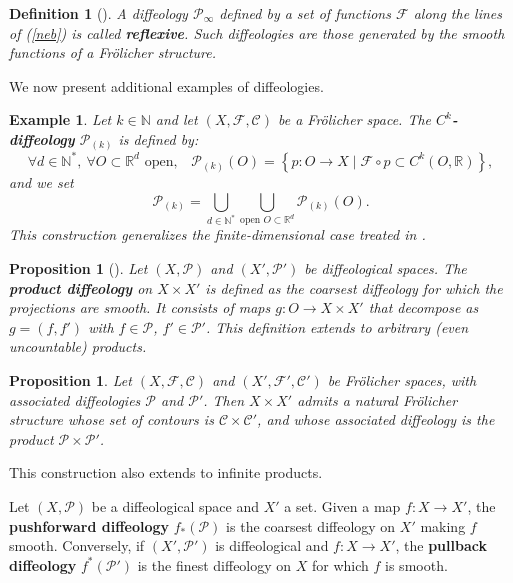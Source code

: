 \documentclass{amsart}
\def\R{\mathbb{R}}
\newcounter{thm}
\newcounter{ex}
\newcounter{re}
\newtheorem{Proposition}[thm]{Proposition}
\newtheorem{example}[thm]{Example}
\newtheorem{Definition}[thm]{Definition}
\begin{document}
\begin{Definition}[\cite{Wa}]
	A diffeology $\mathcal{P}_\infty$ defined by a set of functions $\mathcal{F}$ along the lines of {\rm (\ref{neb})} is called \textbf{reflexive}. Such diffeologies are those generated by the smooth functions of a Fr\"olicher structure.
\end{Definition}

We now present additional examples of diffeologies.

\begin{example}
	Let $k \in \mathbb{N}$ and let $(X, \mathcal{F}, \mathcal{C})$ be a Fr\"olicher space. The \textbf{$C^k$-diffeology} $\mathcal{P}_{(k)}$ is defined by:
	\[
	\forall d \in \mathbb{N}^*, \ \forall O \subset \R^d \text{ open,} \quad 
	\mathcal{P}_{(k)}(O) = \left\{ p: O \to X \mid \mathcal{F} \circ p \subset C^k(O, \R) \right\},
	\]
	and we set
	\[
	\mathcal{P}_{(k)} = \bigcup_{d \in \mathbb{N}^*} \bigcup_{\text{open } O \subset \R^d} \mathcal{P}_{(k)}(O).
	\]
	This construction generalizes the finite-dimensional case treated in \cite{Igdiff}.
\end{example}

\begin{Proposition}[\cite{Igdiff, Sou}] \label{prod1}
	Let $(X, \mathcal{P})$ and $(X', \mathcal{P}')$ be diffeological spaces. The \textbf{product diffeology} on $X \times X'$ is defined as the coarsest diffeology for which the projections are smooth. It consists of maps $g: O \to X \times X'$ that decompose as $g = (f, f')$ with $f \in \mathcal{P}$, $f' \in \mathcal{P}'$. This definition extends to arbitrary (even uncountable) products.
\end{Proposition}

\begin{Proposition} \label{prod2}
	Let $(X, \mathcal{F}, \mathcal{C})$ and $(X', \mathcal{F}', \mathcal{C}')$ be Fr\"olicher spaces, with associated diffeologies $\mathcal{P}$ and $\mathcal{P}'$. Then $X \times X'$ admits a natural Fr\"olicher structure whose set of contours is $\mathcal{C} \times \mathcal{C}'$, and whose associated diffeology is the product $\mathcal{P} \times \mathcal{P}'$.
\end{Proposition}

This construction also extends to infinite products.

Let $(X, \mathcal{P})$ be a diffeological space and $X'$ a set. Given a map $f: X \to X'$, the \textbf{pushforward diffeology} $f_*(\mathcal{P})$ is the coarsest diffeology on $X'$ making $f$ smooth. Conversely, if $(X', \mathcal{P}')$ is diffeological and $f: X \to X'$, the \textbf{pullback diffeology} $f^*(\mathcal{P}')$ is the finest diffeology on $X$ for which $f$ is smooth.
\end{document}
